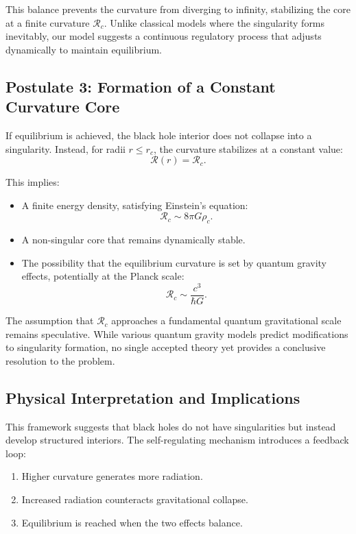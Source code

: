 This balance prevents the curvature from diverging to infinity, stabilizing the core at a finite curvature \( \mathcal{R}_c \). Unlike classical models where the singularity forms inevitably, our model suggests a continuous regulatory process that adjusts dynamically to maintain equilibrium.

\subsection{Postulate 3: Formation of a Constant Curvature Core}

If equilibrium is achieved, the black hole interior does not collapse into a singularity. Instead, for radii \( r \leq r_c \), the curvature stabilizes at a constant value:
\begin{equation}
    \mathcal{R}(r) = \mathcal{R}_c.
\end{equation}

This implies:
\begin{itemize}
    \item A finite energy density, satisfying Einstein's equation:
    \begin{equation}
        \mathcal{R}_c \sim 8\pi G \rho_c.
    \end{equation}
    \item A non-singular core that remains dynamically stable.
    \item The possibility that the equilibrium curvature is set by quantum gravity effects, potentially at the Planck scale:
    \begin{equation}
        \mathcal{R}_c \sim \frac{c^3}{\hbar G}.
    \end{equation}
\end{itemize}

The assumption that \( \mathcal{R}_c \) approaches a fundamental quantum gravitational scale remains speculative. While various quantum gravity models predict modifications to singularity formation, no single accepted theory yet provides a conclusive resolution to the problem.

\subsection{Physical Interpretation and Implications}

This framework suggests that black holes do not have singularities but instead develop structured interiors. The self-regulating mechanism introduces a feedback loop:
\begin{enumerate}
    \item Higher curvature generates more radiation.
    \item Increased radiation counteracts gravitational collapse.
    \item Equilibrium is reached when the two effects balance.
\end{enumerate}

